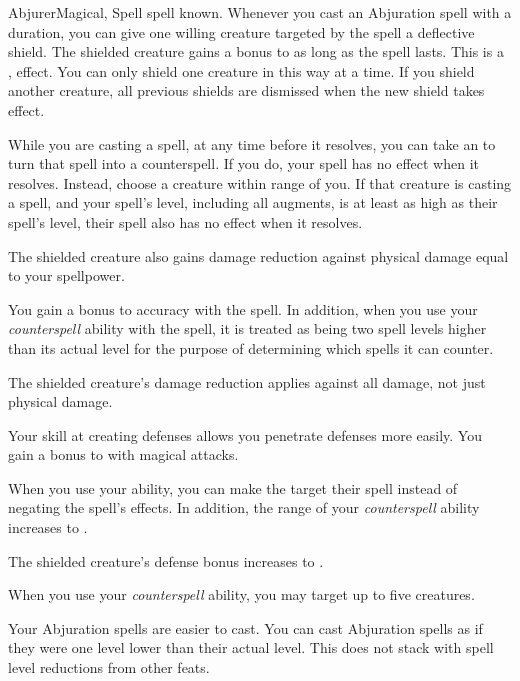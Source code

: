     \begin{feat}{Abjurer}{Magical, Spell}
        \featpre {} spell known.
        \featben
         Whenever you cast an Abjuration spell with a duration, you can give one willing creature targeted by the spell a deflective shield.
        The shielded creature gains a  bonus to  as long as the spell lasts.
        This is a ,  effect.
        You can only shield one creature in this way at a time.
        If you shield another creature, all previous shields are dismissed when the new shield takes effect.

         While you are casting a spell, at any time before it resolves, you can take an  to turn that spell into a counterspell.
        If you do, your spell has no effect when it resolves.
        Instead, choose a creature within \rngmed range of you.
        If that creature is casting a spell, and your spell's level, including all augments, is at least as high as their spell's level, their spell also has no effect when it resolves.

         The shielded creature also gains damage reduction against physical damage equal to your spellpower.

         You gain a  bonus to accuracy with the  spell.
        In addition, when you use your \textit{counterspell} ability with the  spell, it is treated as being two spell levels higher than its actual level for the purpose of determining which spells it can counter.

         The shielded creature's damage reduction applies against all damage, not just physical damage.

         Your skill at creating defenses allows you penetrate defenses more easily.
        You gain a  bonus to  with magical attacks.

         When you use your  ability, you can make the target  their spell instead of negating the spell's effects.
        In addition, the range of your \textit{counterspell} ability increases to \rnglong.

         The shielded creature's defense bonus increases to .

         When you use your \textit{counterspell} ability, you may target up to five creatures.

         Your Abjuration spells are easier to cast.
        You can cast Abjuration spells as if they were one level lower than their actual level.
        This does not stack with spell level reductions from other feats.
    \end{feat}


